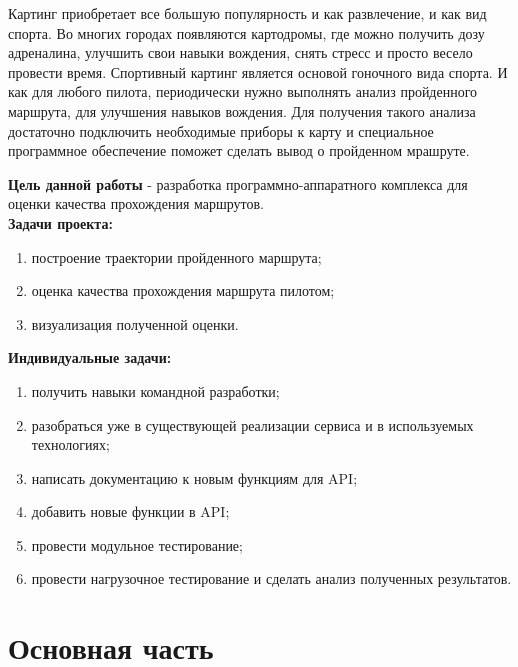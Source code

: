 \documentclass[a4paper, 10pt]{article}
\begin{document}
	\hspace*{5mm}Картинг приобретает все большую популярность и как развлечение, и как вид спорта. Во многих городах появляются картодромы, где можно получить дозу адреналина, улучшить свои навыки вождения, снять стресс и просто весело провести время. Спортивный картинг является основой гоночного вида спорта. И как для любого пилота, периодически нужно выполнять анализ пройденного маршрута, для улучшения навыков вождения. Для получения такого анализа достаточно подключить необходимые приборы к карту и специальное программное обеспечение поможет сделать вывод о пройденном мрашруте.
	 
	\vspace{1cm}\hspace*{-5mm}\textbf{Цель данной работы} - разработка программно-аппаратного комплекса для оценки качества прохождения маршрутов.
	 \vspace{1cm}\\\textbf{Задачи проекта:}
	 \begin{enumerate}
	 	\item построение траектории пройденного маршрута;
	 	\item оценка качества прохождения маршрута пилотом;
	 	\item визуализация полученной оценки.
	 \end{enumerate}
	 \textbf{Индивидуальные задачи:}
	 \begin{enumerate}
	 	\item получить навыки командной разработки;
	 	\item разобраться уже в существующей реализации сервиса и в используемых технологиях;
	 	\item написать документацию к новым функциям для API;
	 	\item добавить новые функции в API;
	 	\item провести модульное тестирование;
	 	\item провести нагрузочное тестирование и сделать анализ полученных результатов.
	 \end{enumerate}
\clearpage
\newpage
\section*{Основная часть}
\end{document}
